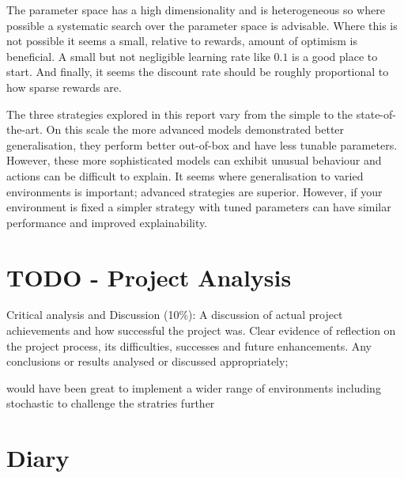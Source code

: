 \documentclass[]{final_report}
\begin{document}
The parameter space has a high dimensionality and is heterogeneous so where possible a systematic search over the parameter space is advisable. Where this is not possible it seems a small, relative to rewards, amount of optimism is beneficial. A small but not negligible learning rate like $0.1$ is a good place to start. And finally, it seems the discount rate should be roughly proportional to how sparse rewards are. 

The three strategies explored in this report vary from the simple to the state-of-the-art. On this scale the more advanced models demonstrated better generalisation, they perform better out-of-box and have less tunable parameters. However, these more sophisticated models can exhibit unusual behaviour and actions can be difficult to explain. It seems where generalisation to varied environments is important; advanced strategies are superior. However, if your environment is fixed a simpler strategy with tuned parameters can have similar performance and improved explainability.



\chapter{TODO - Project Analysis}

Critical analysis and Discussion (10\%): A discussion of actual project achievements and how successful the project was. Clear evidence of reflection on the project process, its difficulties, successes and future enhancements. Any conclusions or results analysed or discussed appropriately;


would have been great to implement a wider range of environments including stochastic to challenge the stratries further

\newpage




\appendix

\chapter{Diary}





\label{endpage}
\end{document}
